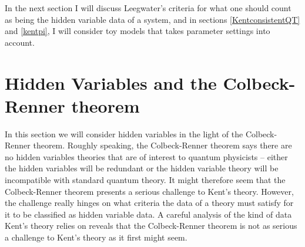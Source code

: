\documentclass[12pt]{report}
\begin{document}
In the next section I will discuss Leegwater's criteria for what one should count as being the hidden variable data of a system, and in sections \ref{KentconsistentQT} and \ref{kentpi}, I will consider toy models that takes parameter settings into account.




\section{Hidden Variables and the Colbeck-Renner theorem\label{colbeckrennerthm}}
In this section we will consider hidden variables in the light of the Colbeck-Renner theorem. Roughly speaking, the Colbeck-Renner theorem says there are no hidden variables theories that are of interest to quantum physicists -- either the hidden variables will be redundant or the hidden variable theory will be incompatible with standard quantum theory. It might therefore seem that the Colbeck-Renner theorem presents a serious challenge to Kent's theory. However, the challenge really hinges on what criteria the data of a theory must satisfy for it to be classified as hidden variable data. A careful analysis of the kind of data Kent's theory relies on reveals that the Colbeck-Renner theorem is not as serious a challenge to Kent's theory as it first might seem.  
\end{document}
